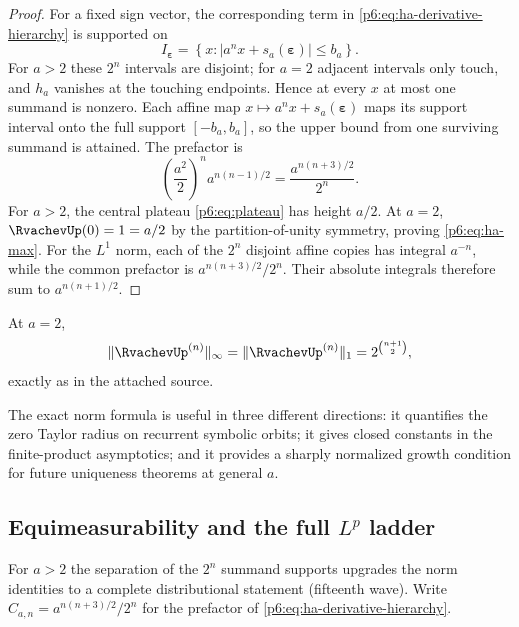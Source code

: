 \documentclass[11pt,oneside]{article}
\numberwithin{equation}{section}
\theoremstyle{definition}
\theoremstyle{remark}
\begin{document}
\begin{proof}
For a fixed sign vector, the corresponding term in
\eqref{p6:eq:ha-derivative-hierarchy} is supported on
\[
 I_{\boldsymbol\varepsilon}
 =\left\{x:\left|a^nx+s_a(\boldsymbol\varepsilon)\right|\le b_a\right\}.
\]
For $a>2$ these $2^n$ intervals are disjoint; for $a=2$ adjacent intervals only
touch, and $h_a$ vanishes at the touching endpoints.  Hence at every $x$ at
most one summand is nonzero.  Each affine map
$x\mapsto a^nx+s_a(\boldsymbol\varepsilon)$ maps its support interval onto the
full support $[-b_a,b_a]$, so the upper bound from one surviving summand is
attained.  The prefactor is
\[
 \left(\frac{a^2}{2}\right)^na^{n(n-1)/2}
 =\frac{a^{n(n+3)/2}}{2^n}.
\]
For $a>2$, the central plateau \eqref{p6:eq:plateau} has height $a/2$.  At $a=2$,
$\RvachevUp(0)=1=a/2$ by the partition-of-unity symmetry, proving
\eqref{p6:eq:ha-max}.  For the $L^1$ norm, each of the $2^n$ disjoint affine copies
has integral $a^{-n}$, while the common prefactor is
$a^{n(n+3)/2}/2^n$.  Their absolute integrals therefore sum to
$a^{n(n+1)/2}$.
\end{proof}

\begin{corollary}
At $a=2$,
\[
 \|\RvachevUp^{(n)}\|_\infty
 =\|\RvachevUp^{(n)}\|_1
 =2^{\binom{n+1}{2}},
\]
exactly as in the attached source.
\end{corollary}

\begin{novelbox}
The exact norm formula is useful in three different directions: it quantifies
the zero Taylor radius on recurrent symbolic orbits; it gives closed constants
in the finite-product asymptotics; and it provides a sharply normalized growth
condition for future uniqueness theorems at general $a$.
\end{novelbox}

\subsection{Equimeasurability and the full \texorpdfstring{$L^p$}{Lp} ladder}

For $a>2$ the separation of the $2^n$ summand supports upgrades the norm
identities to a complete distributional statement (fifteenth wave).  Write
$C_{a,n}=a^{n(n+3)/2}/2^n$ for the prefactor of
\eqref{p6:eq:ha-derivative-hierarchy}.
\end{document}
